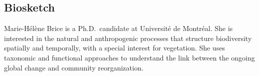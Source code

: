 \documentclass[a4paperpaper,]{article}
\begin{document}
\hypertarget{biosketch}{%
\subsection{Biosketch}\label{biosketch}}

Marie-Hélène Brice is a Ph.D.~candidate at Université de Montréal. She
is interested in the natural and anthropogenic processes that structure
biodiversity spatially and temporally, with a special interest for
vegetation. She uses taxonomic and functional approaches to understand
the link between the ongoing global change and community reorganization.
\end{document}
